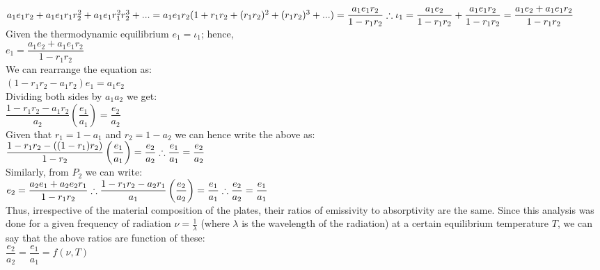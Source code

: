 \documentclass[11pt]{article} %
\numberwithin{equation}{section}
\begin{document}
 $a_1 e_1 r_2+a_1 e_1 r_1 r_2^2+ a_1 e_1 r_1^2 r_2^3+...\\[5pt]
  =a_1 e_1 r_2(1+r_1 r_2+ (r_1 r_2)^2+(r_1 r_2)^3+...) \\[5pt]
  =\dfrac{a_1 e_1 r_2}{1-r_1 r_2}\\ [5pt]
  \therefore \iota_1 = \dfrac{a_1 e_2}{1-r_1 r_2} +\dfrac{a_1 e_1 r_2}{1-r_1 r_2}  = \dfrac{a_1 e_2+a_1 e_1 r_2}{1-r_1 r_2}$\\
 
Given the thermodynamic equilibrium $e_1 = \iota_1$; hence,\\
 
  $e_1=  \dfrac{a_1 e_2+a_1 e_1 r_2}{1-r_1 r_2}$\\

We can rearrange the equation as:\\
 $(1-r_1 r_2-a_1 r_2) e_1=a_1 e_2$\\

Dividing both sides by $a_1 a_2$ we get:\\
 $\dfrac{1-r_1 r_2 -a_1 r_2}{a_2} \left (\dfrac{e_1}{a_1} \right) = \dfrac{e_2}{a_2}$\\

Given that $r_1=1-a_1$ and  $r_2=1-a_2$ we can hence write the above as:\\

  $\dfrac{1-r_1 r_2 -((1 -r_1) r_2)}{1-r_2} \left (\dfrac{e_1}{a_1} \right) = \dfrac{e_2}{a_2} \\[5pt]
 \therefore \dfrac{e_1}{a_1}  = \dfrac{e_2}{a_2}$\\

Similarly, from $P_2$ we can write:\\

 $e_2=  \dfrac{a_2 e_1+a_2 e_2 r_1}{1-r_1 r_2}\\[5pt]
 \therefore \dfrac{1-r_1 r_2 -a_2 r_1}{a_1} \left (\dfrac{e_2}{a_2} \right)=\dfrac{e_1}{a_1}\\[5pt] 
 \therefore \dfrac{e_2}{a_2}  = \dfrac{e_1}{a_1}$\\
 
 Thus, irrespective of the material composition of the plates, their ratios of emissivity to absorptivity are the same. Since this analysis was done for a given frequency of radiation $\nu = \tfrac{1}{\lambda}$ (where $\lambda$ is the wavelength of the radiation) at a certain equilibrium temperature $T$, we can say that the above ratios are function of these:\\
 $\dfrac{e_2}{a_2}  = \dfrac{e_1}{a_1}= f(\nu, T)$\\
\end{document}
